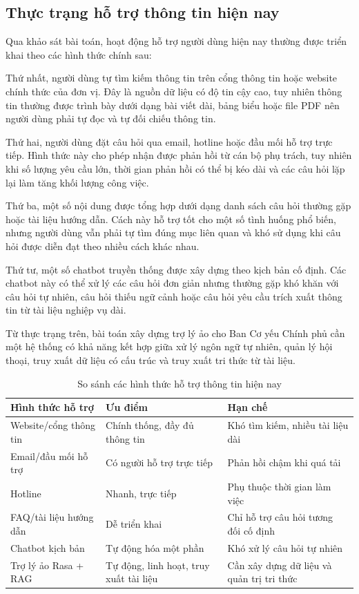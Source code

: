 \subsection{Thực trạng hỗ trợ thông tin hiện nay}

Qua khảo sát bài toán, hoạt động hỗ trợ người dùng hiện nay thường được triển khai theo các hình thức chính sau:

Thứ nhất, người dùng tự tìm kiếm thông tin trên cổng thông tin hoặc website chính thức của đơn vị. Đây là nguồn dữ liệu có độ tin cậy cao, tuy nhiên thông tin thường được trình bày dưới dạng bài viết dài, bảng biểu hoặc file PDF nên người dùng phải tự đọc và tự đối chiếu thông tin.

Thứ hai, người dùng đặt câu hỏi qua email, hotline hoặc đầu mối hỗ trợ trực tiếp. Hình thức này cho phép nhận được phản hồi từ cán bộ phụ trách, tuy nhiên khi số lượng yêu cầu lớn, thời gian phản hồi có thể bị kéo dài và các câu hỏi lặp lại làm tăng khối lượng công việc.

Thứ ba, một số nội dung được tổng hợp dưới dạng danh sách câu hỏi thường gặp hoặc tài liệu hướng dẫn. Cách này hỗ trợ tốt cho một số tình huống phổ biến, nhưng người dùng vẫn phải tự tìm đúng mục liên quan và khó sử dụng khi câu hỏi được diễn đạt theo nhiều cách khác nhau.

Thứ tư, một số chatbot truyền thống được xây dựng theo kịch bản cố định. Các chatbot này có thể xử lý các câu hỏi đơn giản nhưng thường gặp khó khăn với câu hỏi tự nhiên, câu hỏi thiếu ngữ cảnh hoặc câu hỏi yêu cầu trích xuất thông tin từ tài liệu nghiệp vụ dài.

Từ thực trạng trên, bài toán xây dựng trợ lý ảo cho Ban Cơ yếu Chính phủ cần một hệ thống có khả năng kết hợp giữa xử lý ngôn ngữ tự nhiên, quản lý hội thoại, truy xuất dữ liệu có cấu trúc và truy xuất tri thức từ tài liệu.

\begin{table}[H]
    \centering
    \caption{So sánh các hình thức hỗ trợ thông tin hiện nay}
    \label{tab:comparison_admission_consulting_methods}
    \begin{tabular}{|p{3.4cm}|p{5.2cm}|p{5.2cm}|}
        \hline
        \textbf{Hình thức hỗ trợ} & \textbf{Ưu điểm} & \textbf{Hạn chế} \\ \hline
        Website/cổng thông tin & Chính thống, đầy đủ thông tin & Khó tìm kiếm, nhiều tài liệu dài \\ \hline
        Email/đầu mối hỗ trợ & Có người hỗ trợ trực tiếp & Phản hồi chậm khi quá tải \\ \hline
        Hotline & Nhanh, trực tiếp & Phụ thuộc thời gian làm việc \\ \hline
        FAQ/tài liệu hướng dẫn & Dễ triển khai & Chỉ hỗ trợ câu hỏi tương đối cố định \\ \hline
        Chatbot kịch bản & Tự động hóa một phần & Khó xử lý câu hỏi tự nhiên \\ \hline
        Trợ lý ảo Rasa + RAG & Tự động, linh hoạt, truy xuất tài liệu & Cần xây dựng dữ liệu và quản trị tri thức \\ \hline
    \end{tabular}
\end{table}

